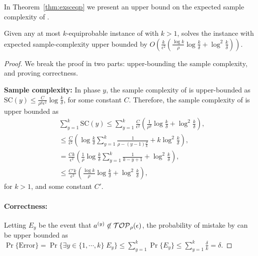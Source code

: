 In Theorem~\ref{thm:exsceqp} we present an upper bound on the expected sample complexity of \KQP.%
\begin{theorem}
\label{thm:exsceqp}
Given any at most $k$-equiprobable instance of \QPK with $k > 1$, 
 \KQP solves the instance with expected 
sample-complexity upper bounded by $O\left(\frac{k}{\epsilon^2}\left(\frac{\log k}{\rho}\log\frac{k}{\delta} + \log^2\frac{k}{\delta}\right)\right)$.
\end{theorem}
\begin{proof}
We break the proof in two parts: upper-bounding the sample complexity, and proving correctness.

\textbf{Sample complexity:} In phase $y$, the sample complexity of \PPP is upper-bounded as
$\text{SC}(y) \leq \frac{C}{\rho^y \epsilon^2}\log\frac{k}{\delta}$, for some constant $C$.
Therefore, the sample complexity of \KQP is upper bounded as 
{\small
\begin{align*}
& \sum_{y=1}^k \text{SC}(y) \leq \sum_{y=1}^k \frac{C}{ \epsilon^2}\left(\frac{1}{\rho^y}\log\frac{k}{\delta} + \log^2\frac{k}{\delta}\right),\\
& \leq  \frac{C}{\epsilon^2}\left(\log\frac{k}{\delta} \sum_{y=1}^k \frac{1}{\rho - (y-1)\frac{\rho}{k}}+ k\log^2\frac{k}{\delta}\right),\\
& = \frac{Ck}{\epsilon^2} \left(\frac{1}{\rho} \log\frac{k}{\delta} \sum_{y=1}^k \frac{1}{k-y+1} + \log^2\frac{k}{\delta}\right),\\
& \leq \frac{C'k}{\epsilon^2}\left(\frac{\log k}{\rho}\log\frac{k}{\delta} + \log^2\frac{k}{\delta}\right),
\end{align*}
}
for $k > 1$, and some constant $C'$.
\paragraph{Correctness:} 
Letting $E_y$ be the event that $a^{(y)} \not\in {\mathcal{TOP}_\rho}(\epsilon)$, the probability of mistake by \KQP can be upper bounded as $\Pr\{\text{Error}\} = \Pr\{\exists y \in \{1, \cdots, k\}\; E_y \} \leq \sum_{y=1}^k \Pr\{E_y \} \leq \sum_{y=1}^k \frac{\delta}{k} = \delta$.
\end{proof}

